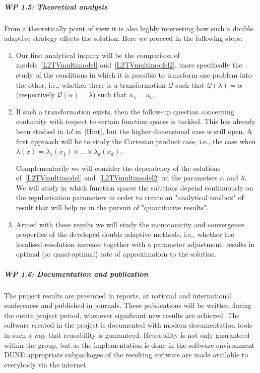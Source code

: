 \documentclass[enabledeprecatedfontcommands,cleardoublepage=empty,headsepline,twoside,11pt,DIV=15,BCOR=12mm,final]{scrartcl}
\begin{document}
 \subparagraph{WP 1.5: Theoretical analysis}

From a theoretically point of view it is also highly interesting how such a double adaptive strategy effects the solution. Here we proceed in the following steps:
 
 \begin{enumerate}
 \item Our first analytical inquiry will be the comparison of models~\eqref{L2TVmultimodel} and~\eqref{L2TVmultimodel2}, more specifically the study of the conditions in which it is possible to transform one problem into the other, i.e., whether there is a transformation $\mathcal{Q}$ such that $\mathcal{Q}(\lambda)=\alpha$ (respectively $\mathcal{Q}(\alpha)=\lambda$) such that $u_\lambda = u_\alpha$. 
 
 \item If such a transformation exists, then the follow-up question concerning continuity with respect to certain function spaces is tackled. This has already been studied in $1d$ in~{[Hint]}, 
but the higher dimensional case is still open. A first approach will be to study the Cartesian product case, i.e., the case when $\lambda(x)=\lambda_1(x_1)\times \dots \times \lambda_d(x_d)$.

Complementarily we will consider the dependency of the solutions of~\eqref{L2TVmultimodel} and~\eqref{L2TVmultimodel2} on the parameters  $\alpha$ and $\lambda$. We will study in which function spaces the solutions depend continuously on the regularisation parameters in order to create an "analytical toolbox" of result that will help us in the pursuit of "quantitative results". 
 
 \item Armed with these results we will study the monotonicity and convergence properties of the developed double adaptive methods, i.e., whether the localised resolution increase together with a parameter adjustment, results in optimal (or quasi-optimal) rate of approximation to the solution. 
 \end{enumerate} 
 
 \subparagraph{WP 1.6: Documentation and publication}
 
 The project results are presented in reports, at national and international conferences and published in journals. These publications will be written during the entire project period, whenever significant new results are achieved. The software created in the project is documented with modern documentation tools in such a way that reusability is guaranteed. Reusability is not only guaranteed within the group, but as the implementation is done in the software environment DUNE appropriate subpackages of the resulting software are made available to everybody via the internet.
 
\end{document}
